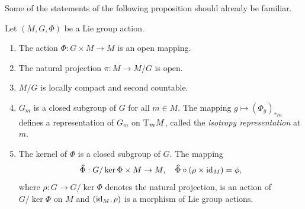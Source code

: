 Some of the statements of the following proposition should already be familiar.

\begin{prop}[{{\cite[Prop.~6.1.5]{RS1}}}]\label{prop 6.1.5 RS1}
    Let $(M,G,\Phi)$ be a Lie group action.
    \begin{enumerate}
        \item The action $\Phi:G\times M\to M$ is an open mapping.
        \item The natural projection $\pi:M\to M\slash G$ is open.
        \item $M\slash G$ is locally compact and second countable.
        \item $G_m$ is a closed subgroup of $G$ for all $m\in M$. The mapping $g\mapsto (\Phi_g)_{\ast m}$ defines a representation of $G_m$ on $\mathrm{T}_mM$, called the \emph{isotropy representation} at $m$.
        \item The kernel of $\Phi$ is a closed subgroup of $G$. The mapping
        \[\wh{\Phi}:G\slash \ker \Phi\times M\to M,\quad \wh{\Phi}\circ(\rho\times\id_M)=\phi,\]
        where $\rho:G\to G\slash\ker\Phi$ denotes the natural projection, is an action of $G\slash\ker\Phi$ on $M$ and $(\operatorname{id}_M,\rho)$ is a morphism of Lie group actions.
    \end{enumerate}
\end{prop}
